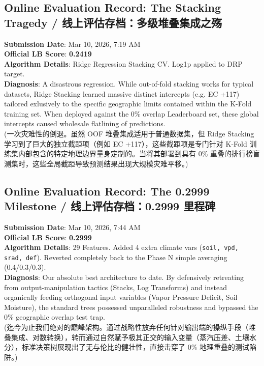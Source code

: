 \subsection{Online Evaluation Record: The Stacking Tragedy / 线上评估存档：多级堆叠集成之殇}
\begin{warningbox}
\textbf{Submission Date}: Mar 10, 2026, 7:19 AM \\
\textbf{Official LB Score}: \textbf{0.2419} \\
\textbf{Algorithm Details}: Ridge Regression Stacking CV. Log1p applied to DRP target. \\
\textbf{Diagnosis}: A disastrous regression. While out-of-fold stacking works for typical datasets, Ridge Stacking learned massive distinct intercepts (e.g. EC +117) tailored exlusively to the specific geographic limits contained within the K-Fold training set. When deployed against the 0\% overlap Leaderboard set, these global intercepts caused wholesale flatlining of predictions. \\
(一次灾难性的倒退。虽然 OOF 堆叠集成适用于普通数据集，但 Ridge Stacking 学习到了巨大的独立截距项（例如 EC +117），这些截距项是专门针对 K-Fold 训练集内部包含的特定地理边界量身定制的。当将其部署到具有 0\% 重叠的排行榜盲测集时，这些全局截距导致预测结果出现大规模灾难平移。)
\end{warningbox}

\subsection{Online Evaluation Record: The 0.2999 Milestone / 线上评估存档：0.2999 里程碑}
\begin{infobox}
\textbf{Submission Date}: Mar 10, 2026, 7:44 AM \\
\textbf{Official LB Score}: \textbf{0.2999} \\
\textbf{Algorithm Details}: 29 Features. Added 4 extra climate vars (\texttt{soil, vpd, srad, def}). Reverted completely back to the Phase N simple averaging (0.4/0.3/0.3). \\
\textbf{Diagnosis}: Our absolute best architecture to date. By defensively retreating from output-manipulation tactics (Stacks, Log Transforms) and instead organically feeding orthogonal input variables (Vapor Pressure Deficit, Soil Moisture), the standard trees possessed unparalleled robustness and bypassed the 0\% geographic overlap test trap. \\
(迄今为止我们绝对的巅峰架构。通过战略性放弃任何针对输出端的操纵手段（堆叠集成、对数转换），转而通过自然赋予极其正交的输入变量（蒸汽压差、土壤水分），标准决策树展现出了无与伦比的健壮性，直接击穿了 0\% 地理重叠的测试陷阱。)
\end{infobox}

